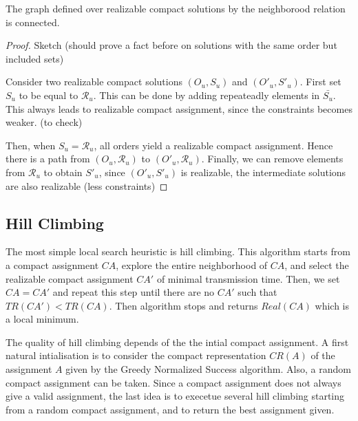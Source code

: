 \documentclass[english]{article}
\begin{document}
 \begin{proposition}
 The graph defined over realizable compact solutions by the neighborood relation is connected.
 \end{proposition}
 \begin{proof}
 Sketch (should prove a fact before on solutions with the same order but included sets)

Consider two realizable compact solutions $(O_u,S_u)$ and $(O'_u,S'_u)$. 
First set $S_u$ to be equal to $\mathcal{R}_u$. This can be done by adding repeateadly elements in $\bar{S_u}$.
This always leads to realizable compact assignment, since the constraints becomes weaker. (to check)

Then, when $S_u = \mathcal{R}_u$, all orders yield a realizable compact assignment. Hence there is a path from
$(O_u,\mathcal{R}_u)$ to $(O'_u,\mathcal{R}_u)$. Finally, we can remove elements from $\mathcal{R}_u$ to obtain 
$S'_u$, since $(O'_u,S'_u)$ is realizable, the intermediate solutions are also realizable (less constraints)
 \end{proof}




\subsection{Hill Climbing}

The most simple local search heuristic is hill climbing. This algorithm starts from a compact assignment $CA$, explore the entire neighborhood of $CA$, and select the realizable compact assignment $CA'$ of minimal transmission time. Then, we set $CA = CA'$ and repeat this step until there are no $CA'$ such that $TR(CA') < TR(CA)$. Then algorithm stops and returns $Real(CA)$ which is a local minimum. 

The quality of hill climbing depends of the the intial compact assignment. A first natural intialisation is to consider the compact representation $CR(A)$ of the assignment $A$ given by the Greedy Normalized Success algorithm. Also, a random compact assignment can be taken. Since a compact assignment does not always give a valid assignment, the last idea is to execetue several hill climbing starting from a random compact assignment, and to return the best assignment given.
\end{document}
